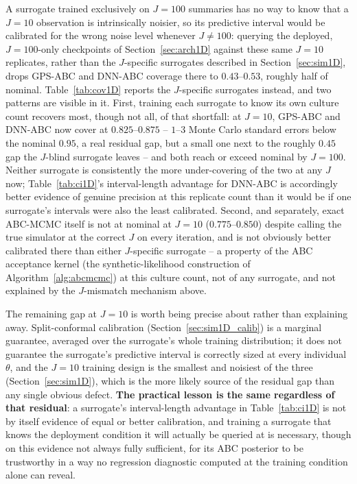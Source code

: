 \documentclass[sn-basic,iicol,pdflatex]{sn-jnl}
\begin{document}
A surrogate trained exclusively on $J=100$ summaries has no way to know that
a $J=10$ observation is intrinsically noisier, so its predictive interval
would be calibrated for the wrong noise level whenever $J \ne 100$: querying
the deployed, $J{=}100$-only checkpoints of Section~\ref{sec:arch1D} against
these same $J=10$ replicates, rather than the $J$-specific surrogates
described in Section~\ref{sec:sim1D}, drops GPS-ABC and DNN-ABC coverage
there to $0.43$--$0.53$, roughly half of nominal. Table~\ref{tab:cov1D}
reports the $J$-specific surrogates instead, and two patterns are visible in
it. First, training each surrogate to know its own culture count recovers
most, though not all, of that shortfall: at $J=10$, GPS-ABC and DNN-ABC now
cover at $0.825$--$0.875$ -- $1$--$3$ Monte Carlo standard errors below the
nominal $0.95$, a real residual gap, but a small one next to the roughly
$0.45$ gap the $J$-blind surrogate leaves -- and both reach or exceed nominal
by $J=100$. Neither surrogate is consistently the more under-covering of the
two at any $J$ now; Table~\ref{tab:ci1D}'s interval-length advantage for
DNN-ABC is accordingly better evidence of genuine precision at this
replicate count than it would be if one surrogate's intervals were also the
least calibrated. Second, and separately, exact ABC-MCMC itself is not at
nominal at $J=10$ ($0.775$--$0.850$) despite calling the true simulator at
the correct $J$ on every iteration, and is not obviously better calibrated
there than either $J$-specific surrogate -- a property of the ABC acceptance
kernel (the synthetic-likelihood construction of Algorithm~\ref{alg:abcmcmc})
at this culture count, not of any surrogate, and not explained by the
$J$-mismatch mechanism above.

The remaining gap at $J=10$ is worth being precise about rather than
explaining away. Split-conformal calibration (Section~\ref{sec:sim1D_calib})
is a marginal guarantee, averaged over the surrogate's whole training
distribution; it does not guarantee the surrogate's predictive interval is
correctly sized at every individual $\theta$, and the $J=10$ training design
is the smallest and noisiest of the three (Section~\ref{sec:sim1D}), which is
the more likely source of the residual gap than any single obvious defect.
\textbf{The practical lesson is the same regardless of that residual}: a
surrogate's interval-length advantage in Table~\ref{tab:ci1D} is not by
itself evidence of equal or better calibration, and training a surrogate
that knows the deployment condition it will actually be queried at is
necessary, though on this evidence not always fully sufficient, for its ABC
posterior to be trustworthy in a way no regression diagnostic computed at
the training condition alone can reveal.
\end{document}
